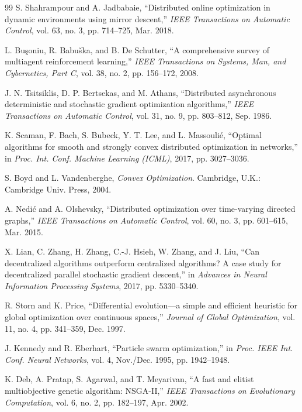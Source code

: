 \documentclass[conference]{IEEEtran}
\begin{document}
\begin{thebibliography}{99}
 S. Shahrampour and A. Jadbabaie, ``Distributed online optimization in dynamic environments using mirror descent,'' \emph{IEEE Transactions on Automatic Control}, vol. 63, no. 3, pp. 714--725, Mar. 2018.

 L. Bu\c{s}oniu, R. Babu\v{s}ka, and B. De Schutter, ``A comprehensive survey of multiagent reinforcement learning,'' \emph{IEEE Transactions on Systems, Man, and Cybernetics, Part C}, vol. 38, no. 2, pp. 156--172, 2008.

 J. N. Tsitsiklis, D. P. Bertsekas, and M. Athans, ``Distributed asynchronous deterministic and stochastic gradient optimization algorithms,'' \emph{IEEE Transactions on Automatic Control}, vol. 31, no. 9, pp. 803--812, Sep. 1986.

 K. Scaman, F. Bach, S. Bubeck, Y. T. Lee, and L. Massouli\'e, ``Optimal algorithms for smooth and strongly convex distributed optimization in networks,'' in \emph{Proc. Int. Conf. Machine Learning (ICML)}, 2017, pp. 3027--3036.

 S. Boyd and L. Vandenberghe, \emph{Convex Optimization}. Cambridge, U.K.: Cambridge Univ. Press, 2004.

 A. Nedi\'c and A. Olshevsky, ``Distributed optimization over time-varying directed graphs,'' \emph{IEEE Transactions on Automatic Control}, vol. 60, no. 3, pp. 601--615, Mar. 2015.

 X. Lian, C. Zhang, H. Zhang, C.-J. Hsieh, W. Zhang, and J. Liu, ``Can decentralized algorithms outperform centralized algorithms? A case study for decentralized parallel stochastic gradient descent,'' in \emph{Advances in Neural Information Processing Systems}, 2017, pp. 5330--5340.

 R. Storn and K. Price, ``Differential evolution---a simple and efficient heuristic for global optimization over continuous spaces,'' \emph{Journal of Global Optimization}, vol. 11, no. 4, pp. 341--359, Dec. 1997.

 J. Kennedy and R. Eberhart, ``Particle swarm optimization,'' in \emph{Proc. IEEE Int. Conf. Neural Networks}, vol. 4, Nov./Dec. 1995, pp. 1942--1948.

 K. Deb, A. Pratap, S. Agarwal, and T. Meyarivan, ``A fast and elitist multiobjective genetic algorithm: NSGA-II,'' \emph{IEEE Transactions on Evolutionary Computation}, vol. 6, no. 2, pp. 182--197, Apr. 2002.


\end{thebibliography}
\end{document}
